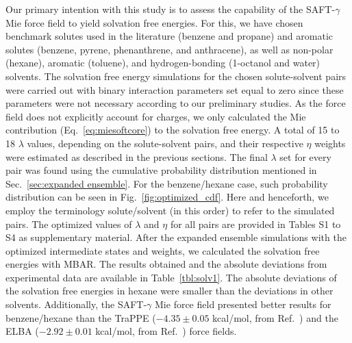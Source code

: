 \documentclass[preprint]{elsarticle}
\begin{document}
	Our primary intention with this study is to assess the capability of the SAFT-$\gamma$ Mie force field to yield solvation free energies. For this, we have chosen benchmark solutes used in the literature (benzene and propane) and aromatic solutes (benzene, pyrene, phenanthrene, and anthracene), as well as non-polar (hexane), aromatic (toluene), and hydrogen-bonding (1-octanol and water) solvents. The solvation free energy simulations for the chosen solute-solvent pairs were carried out with binary interaction parameters set equal to zero since these parameters were not necessary according to our preliminary studies. As the force field does not explicitly account for charges, we only calculated the Mie contribution (Eq.~\eqref{eq:miesoftcore}) to the solvation free energy. A total of 15 to 18 $\lambda$ values, depending on the solute-solvent pairs, and their respective $\eta$ weights were estimated as described in the previous sections. The final $\lambda$ set for every pair was found using the cumulative probability distribution mentioned in Sec.~\ref{sec:expanded ensemble}. For the benzene/hexane case, such probability distribution can be seen in Fig.~\ref{fig:optimized_cdf}. Here and henceforth, we employ the terminology solute/solvent (in this order) to refer to the simulated pairs. The optimized values of $\lambda$ and $\eta$ for all pairs are provided in Tables S1 to S4 as supplementary material.
	After the expanded ensemble simulations with the optimized intermediate states and weights, we calculated the solvation free energies with MBAR. The results obtained and the absolute deviations from experimental data \cite{doi:10.1021/ci034120c} are available in Table~\ref{tbl:solv1}. The absolute deviations of the solvation free energies in hexane were smaller than the deviations in other solvents.
	Additionally, the SAFT-$\gamma$ Mie force field presented better results for benzene/hexane than the TraPPE ($- 4.35 \pm 0.05$ kcal/mol, from Ref.~) and the ELBA ($-2.92 \pm 0.01$ kcal/mol, from Ref.~) force fields.
\end{document}
